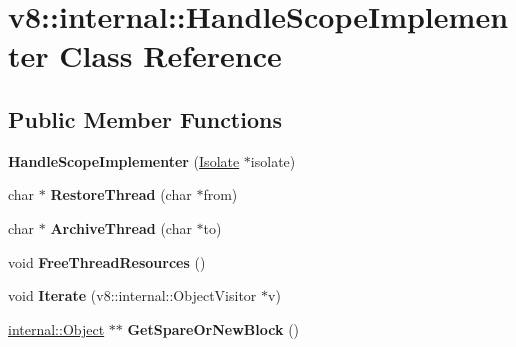 \hypertarget{classv8_1_1internal_1_1_handle_scope_implementer}{}\section{v8\+:\+:internal\+:\+:Handle\+Scope\+Implementer Class Reference}
\label{classv8_1_1internal_1_1_handle_scope_implementer}
\subsection*{Public Member Functions}
\begin{DoxyCompactItemize}
\item 
{\bfseries Handle\+Scope\+Implementer} (\hyperlink{classv8_1_1internal_1_1_isolate}{Isolate} $\ast$isolate)\hypertarget{classv8_1_1internal_1_1_handle_scope_implementer_a8a8b3601372eacaddfe9eae275e7bdc5}{}\label{classv8_1_1internal_1_1_handle_scope_implementer_a8a8b3601372eacaddfe9eae275e7bdc5}

\item 
char $\ast$ {\bfseries Restore\+Thread} (char $\ast$from)\hypertarget{classv8_1_1internal_1_1_handle_scope_implementer_aba36eab4b28babfa77c6c4e033e588c7}{}\label{classv8_1_1internal_1_1_handle_scope_implementer_aba36eab4b28babfa77c6c4e033e588c7}

\item 
char $\ast$ {\bfseries Archive\+Thread} (char $\ast$to)\hypertarget{classv8_1_1internal_1_1_handle_scope_implementer_a62d016202e4b0555cea27a762608b275}{}\label{classv8_1_1internal_1_1_handle_scope_implementer_a62d016202e4b0555cea27a762608b275}

\item 
void {\bfseries Free\+Thread\+Resources} ()\hypertarget{classv8_1_1internal_1_1_handle_scope_implementer_a3e23aca523c7e6549024c75f7985ea34}{}\label{classv8_1_1internal_1_1_handle_scope_implementer_a3e23aca523c7e6549024c75f7985ea34}

\item 
void {\bfseries Iterate} (v8\+::internal\+::\+Object\+Visitor $\ast$v)\hypertarget{classv8_1_1internal_1_1_handle_scope_implementer_a7d8cd9ab951e5aacf899920ce3511b69}{}\label{classv8_1_1internal_1_1_handle_scope_implementer_a7d8cd9ab951e5aacf899920ce3511b69}

\item 
\hyperlink{classv8_1_1internal_1_1_object}{internal\+::\+Object} $\ast$$\ast$ {\bfseries Get\+Spare\+Or\+New\+Block} ()\hypertarget{classv8_1_1internal_1_1_handle_scope_implementer_a550cf59642751039843ac5c054d6992f}{}\label{classv8_1_1internal_1_1_handle_scope_implementer_a550cf59642751039843ac5c054d6992f}


\end{DoxyCompactItemize}
